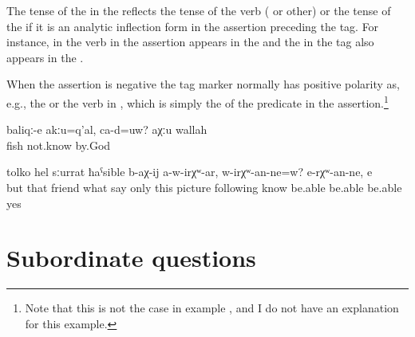 The tense of the  in the  reflects the tense of the verb ( or other) or the tense of the  if it is an analytic inflection form in the assertion preceding the tag. For instance, in  the verb in the assertion appears in the  and the  in the tag also appears in the .

When the assertion is negative the tag marker normally has positive polarity as, e.g., the    or the verb in , which is simply the  of the predicate in the assertion.\footnote{Note that this is not the case in example , and I do not have an explanation for this example.}
%
\begin{exe}
	\ex	\label{ex:(These) are not fish, are they? By God, I don't know}
	\gll	baliqː-e	akːu=q'al,	ca-d=uw? 	aχːu	wallah\\
		fish		 	not.know	by.God\\
	\glt	{}

	\ex	\label{ex:And these friends, what they are saying, only by means of the picture, (one) cannot know, can one? One cannot know, yes}
	\gll	[a	iš-tːi	juldašː-e	ce	b-ik'-ul=el]	tolko	hel sːurrat	ħaˁsible	b-aχ-ij	a-w-irχʷ-ar,	w-irχʷ-an-ne=w? 		e-rχʷ-an-ne,	e\\
		but	that	friend	what	say	only	this picture	following	know	be.able be.able	be.able	yes\\
	\glt	{}
\end{exe}



\section{Subordinate questions}
\label{sec:Subordinate questions}

